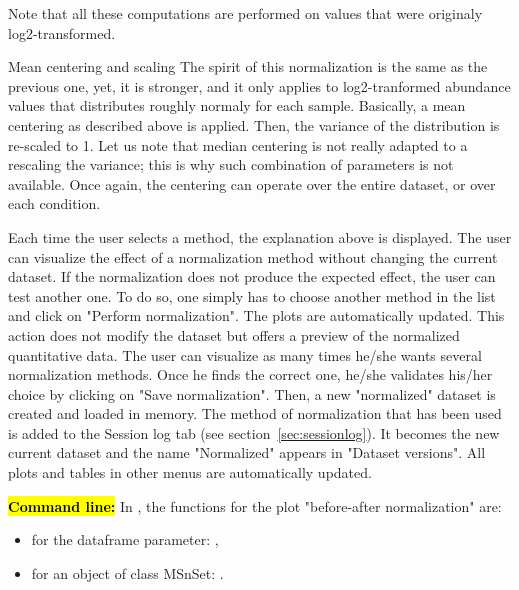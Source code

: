 \documentclass[12pt]{article}
\begin{document}
\begin {description}
Note that all these computations are performed on values that were originaly 
log2-transformed.
    \item[Mean centering and scaling] The spirit of this normalization is 
    the same as the previous one, yet, it is stronger, and it only applies 
    to log2-tranformed abundance values that distributes roughly normaly for 
    each sample. Basically, a mean centering as described above is applied. 
    Then, the variance of the distribution is re-scaled to 1. Let us note 
    that median centering is not really adapted to a rescaling the variance; 
    this is why such combination of parameters is not available. Once again, 
    the centering can operate over the entire dataset, or over each condition.
\end {description}

Each time the user selects a method, the explanation above is displayed. The 
user can visualize the effect of a normalization method without changing the 
current dataset. If the normalization does not produce the expected effect, 
the user can test another one. To do so, one simply has to choose another 
method in the list and click on "Perform normalization". The plots are 
automatically updated. This action does not modify the dataset but offers a 
preview of the normalized quantitative data.
The user can visualize as many times he/she wants several normalization 
methods. Once he finds the correct one, he/she validates his/her choice by 
clicking on "Save normalization". Then, a new "normalized" dataset is created 
and loaded in memory. The method of normalization that has been used is 
added to the Session log tab (see section~\ref{sec:sessionlog}). It becomes 
the new current dataset and the name "Normalized" appears in "Dataset 
versions". All plots and tables in other menus are automatically updated.

{\hl{\bf Command line:} In , the functions for the plot 
"before-after normalization" are:
\begin{itemize}
\item for the dataframe parameter:  ,
\item for an object of class MSnSet: 
 .
\end{itemize}}
\end{document}
